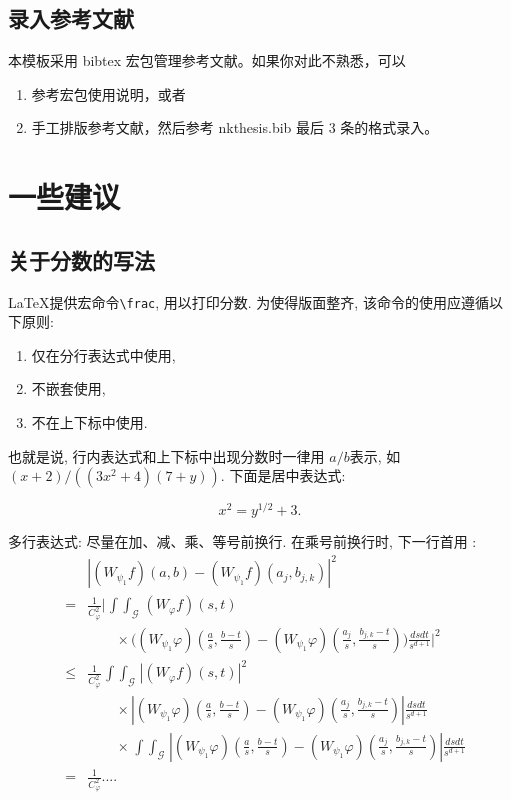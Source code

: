 \subsection{录入参考文献}

本模板采用 bibtex 宏包管理参考文献。如果你对此不熟悉，可以
\begin{enumerate}
\item 参考宏包使用说明，或者
\item 手工排版参考文献，然后参考 nkthesis.bib 最后 3 条的格式录入。
\end{enumerate}



\section{一些建议}
\subsection{关于分数的写法}


\LaTeX 提供宏命令\verb+\frac+, 用以打印分数. 为使得版面整齐, 该命令的使用应遵循以下原则:

\begin{enumerate}
\item 仅在分行表达式中使用,
\item 不嵌套使用,
\item 不在上下标中使用.
\end{enumerate}

也就是说, 行内表达式和上下标中出现分数时一律用 $a/b$表示, 如
$(x+2)/((3x^2+4)(7+y))$. 下面是居中表达式:

\[
 x^2 = y^{1/2} +3.
\]

多行表达式: 尽量在加、减、乘、等号前换行. 在乘号前换行时,
下一行首用 \string\times:
\def\iint{\mathop{\int\!\!\!\int}}\def\calG{\mathcal G}
\begin{eqnarray}
&&\left|(W_{\psi_1}f)(a,b)-(W_{\psi_1}f)(a_j,b_{j,k})\right|^{2}\nonumber\\
&=&\frac{1}{C^{2}_{\varphi}}\Bigg|\iint_{\calG} (W_{\varphi}f)(s,t) \nonumber\\
&&\qquad\times \Bigg( (W_{\psi_1}\varphi)\left(\frac{a}{s},
\frac{b-t}{s}\right)
     -(W_{\psi_1}\varphi)\left(\frac{a_{j}}{s}, \frac{b_{j,k}-t}{s}\right)\Bigg)
  \frac{dsdt}{s^{d+1}}\Bigg|^2 \nonumber\\
&\le& \frac{1}{C^2_{\varphi}} \iint_{\calG} |(W_{\varphi}f)(s,t)|^2 \nonumber\\
&&\qquad \times\left| (W_{\psi_1}\varphi)\left(\frac{a}{s},
\frac{b-t}{s}\right)
    -(W_{\psi_1}\varphi)\left(\frac{a_{j}}{s}, \frac{b_{j,k}-t}{s}\right)\right|
   \frac{dsdt}{s^{d+1}}  \nonumber\\
&&\qquad \times   \iint_{\calG}\!
 \left|(W_{\psi_1}\varphi)\left(\frac{a}{s}, \frac{b-t}{s}\right)
    -(W_{\psi_1}\varphi)\left(\frac{a_{j}}{s}, \frac{b_{j,k}-t}{s}\right)\right|
 \frac{ ds dt}{s^{d+1}} \nonumber\\
&=& \frac{1}{C^2_{\varphi}} ....  \label{eq:a0}
\end{eqnarray}


